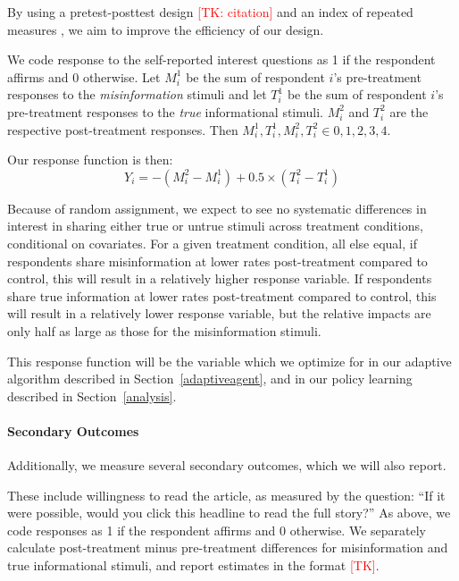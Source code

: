 \documentclass[letterpaper, 12pt, parskip=full,]{scrartcl}
\begin{document}
By using a pretest-posttest design \textcolor{red}{[TK: citation]} and an index of repeated measures \citep{broockman2017design}, we aim to improve the efficiency of our design. 


We code response to the self-reported interest questions as 1 if the respondent affirms and 0 otherwise. Let $M_i^1$ be the sum of respondent $i$'s pre-treatment responses to the \textit{misinformation} stimuli and let $T_i^1$ be the sum of respondent $i$'s pre-treatment responses to the \textit{true} informational stimuli. $M_i^2$ and $T_i^2$ are the respective post-treatment responses. Then $M_i^1, T_i^1, M_i^2, T_i^2 \in {0,1,2,3,4}$. 

Our response function is then:
\[
Y_i = -(M_i^2 - M_i^1) + 0.5 \times (T_i^2 - T_i^1)
\]

Because of random assignment, we expect to see no systematic differences in interest in sharing either true or untrue stimuli across treatment conditions, conditional on covariates. For a given treatment condition, all else equal, if respondents share misinformation at lower rates post-treatment compared to control, this will result in a relatively higher response variable. If respondents share true information at lower rates post-treatment compared to control, this will result in a relatively lower response variable, but the relative impacts are only half as large as those for the misinformation stimuli. 

This response function will be the variable which we optimize for in our adaptive algorithm described in Section~\ref{adaptiveagent}, and in our policy learning described in Section~\ref{analysis}. 

\paragraph{Secondary Outcomes}
Additionally, we measure several secondary outcomes, which we will also report. 

These include willingness to read the article, as measured by the question: ``If it were possible, would you click this headline to read the full story?'' As above, we code responses as 1 if the respondent affirms and 0 otherwise. We separately calculate post-treatment minus pre-treatment differences for misinformation and true informational stimuli, and report estimates in the format \textcolor{red}{[TK]}. 
\end{document}
